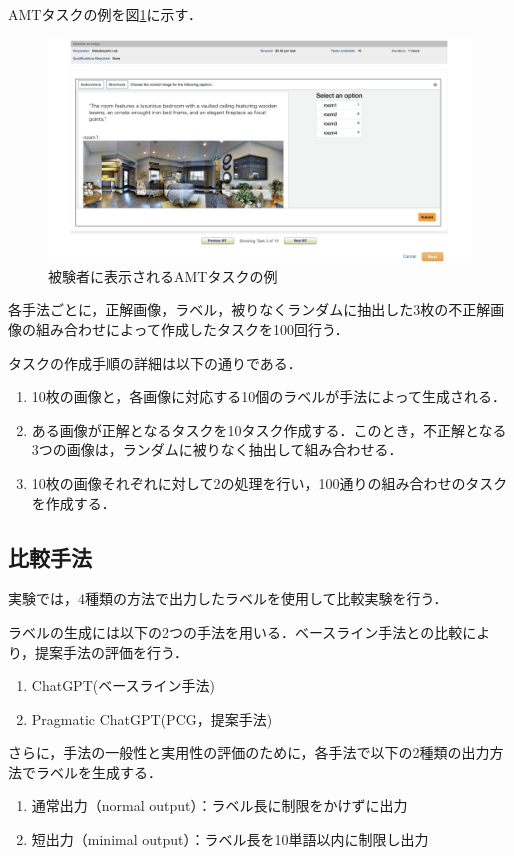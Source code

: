\documentclass[a4paper,11pt]{jreport}
\begin{document}
AMTタスクの例を図\ref{fig:amt_example}に示す．

\begin{figure}[H]
  \centering
  \includegraphics[width=\linewidth]{figures/amt.png}
  \caption{被験者に表示されるAMTタスクの例}
  \label{fig:amt_example}
\end{figure}

各手法ごとに，正解画像，ラベル，被りなくランダムに抽出した3枚の不正解画像の組み合わせによって作成したタスクを100回行う．

タスクの作成手順の詳細は以下の通りである．
\begin{enumerate}
  \item 10枚の画像と，各画像に対応する10個のラベルが手法によって生成される．
  \item ある画像が正解となるタスクを10タスク作成する．このとき，不正解となる3つの画像は，ランダムに被りなく抽出して組み合わせる．
  \item 10枚の画像それぞれに対して2の処理を行い，100通りの組み合わせのタスクを作成する．
\end{enumerate}

\subsection{比較手法}

実験では，4種類の方法で出力したラベルを使用して比較実験を行う．

ラベルの生成には以下の2つの手法を用いる．ベースライン手法との比較により，提案手法の評価を行う．
\begin{enumerate}
    \item ChatGPT(ベースライン手法)
    \item Pragmatic ChatGPT(PCG，提案手法)
\end{enumerate}

さらに，手法の一般性と実用性の評価のために，各手法で以下の2種類の出力方法でラベルを生成する．
\begin{enumerate}
  \item 通常出力（normal output）：ラベル長に制限をかけずに出力
  \item 短出力（minimal output）：ラベル長を10単語以内に制限し出力
\end{enumerate}
\end{document}
